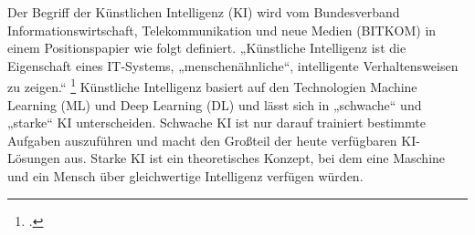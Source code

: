 Der Begriff der Künstlichen Intelligenz (KI) wird vom Bundesverband Informationswirtschaft, Telekommunikation und neue Medien (BITKOM) in einem Positionspapier wie folgt definiert. 
„Künstliche Intelligenz ist die Eigenschaft eines IT-Systems, „menschenähnliche“, intelligente Verhaltensweisen zu zeigen.“ \footcite[S.16 f.]{beins_kunstliche_2017} 
Künstliche Intelligenz basiert auf den Technologien Machine Learning (ML) und Deep Learning (DL) und lässt sich in „schwache“ und „starke“ KI unterscheiden. 
Schwache KI ist nur darauf trainiert bestimmte Aufgaben auszuführen und macht den Großteil der heute verfügbaren KI-Lösungen aus. 
Starke KI ist ein theoretisches Konzept, bei dem eine Maschine und ein Mensch über gleichwertige Intelligenz verfügen würden. 